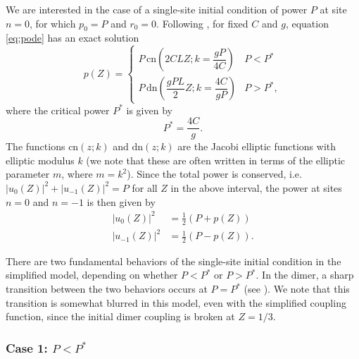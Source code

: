 \documentclass[reprint, amsmath,amssymb,aps,pre]{revtex4-2}
\begin{document}
We are interested in the case of a single-site initial condition of power $P$ at site $n=0$, for which $p_0 = P$ and $r_0 = 0$. Following \cite{Kenkre1986}, for fixed $C$ and $g$, equation \cref{eq:pode} has an exact solution
\begin{equation}\label{eq:psol}
p(Z) =
\begin{cases}
P\,\text{cn}\left(2CLZ ; k=\dfrac{g P}{4C} \right) & P < P^*\\
P\,\text{dn}\left(\dfrac{g P L}{2}Z ; k=\dfrac{4C}{g P} \right) & P > P^*,
\end{cases}
\end{equation}
where the critical power $P^*$ is given by
\begin{equation}\label{eq:pstar}
P^* = \dfrac{4C}{g}.
\end{equation}
The functions $\text{cn}(z ; k)$ and $\text{dn}(z ; k)$ are the Jacobi elliptic functions with elliptic modulus $k$ (we note that these are often written in terms of the elliptic parameter $m$, where $m = k^2$). Since the total power is conserved, i.e. $|u_0(Z)|^2 + |u_{-1}(Z)|^2 = P$ for all $Z$ in the above interval, 
the power at sites $n=0$ and $n=-1$ is then given by
\begin{equation}\label{eq:u0u-1}
\begin{aligned}
|u_0(Z)|^2 &= \frac{1}{2}\left( P + p(Z) \right)\\
|u_{-1}(Z)|^2 &= \frac{1}{2}\left( P - p(Z) \right).
\end{aligned}
\end{equation}

There are two fundamental behaviors of the single-site initial condition in the simplified model, depending on whether $P < P^*$ or $P > P^*$. In the dimer, a sharp transition between the two behaviors occurs at $P = P^*$ (see \cite{Kenkre1986}). We note that this transition is somewhat blurred in this model, even with the simplified coupling function, since the initial dimer coupling is broken at $Z=1/3$.

\subsubsection{\texorpdfstring{Case 1: $P < P^*$}{Case 1: P < Pstar}}
\end{document}
